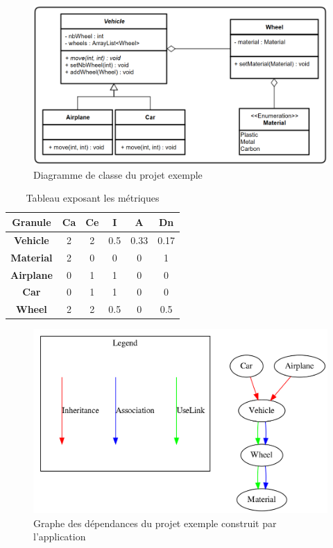 \documentclass{scrartcl}
\begin{document}
\begin{appendices}
\begin{figure}[h!]
    \centering
    \includegraphics[scale=0.6]{img/example_uml.png}
    \caption{Diagramme de classe du projet exemple}
\end{figure}


\begin{table}[H]\caption{Tableau exposant les métriques}
    \centering
    \begin{tabular}{|c|c|c|c|c|c|}
        \hline
        \textbf{Granule} & \textbf{Ca} & \textbf{Ce} & \textbf{I} & \textbf{A} & \textbf{Dn} \\
        \hline
        \textbf{Vehicle} & 2 & 2 & 0.5 & 0.33 & 0.17 \\
        \hline
        \textbf{Material} & 2 & 0 & 0 & 0 & 1 \\
        \hline
        \textbf{Airplane} & 0 & 1 & 1 & 0 & 0  \\
        \hline
        \textbf{Car} & 0 & 1 & 1 & 0 & 0 \\
        \hline
        \textbf{Wheel} & 2 & 2 & 0.5 & 0 & 0.5 \\
        \hline
    \end{tabular}
\end{table}


\begin{figure}
    \centering
    \includegraphics[scale=0.6]{img/ExampleClassesGraph.png}
    \caption{Graphe des dépendances du projet exemple construit par l'application}
\end{figure}

\end{appendices}
\end{document}
